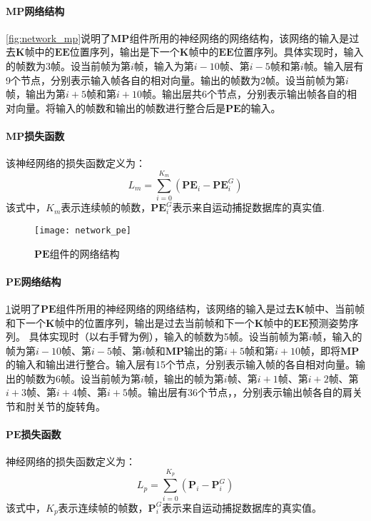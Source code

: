 \paragraph{$\mathbf{MP}$网络结构}\cref{fig:network_mp}说明了$\mathbf{MP}$组件所用的神经网络的网络结构，该网络的输入是过去$\mathbf{K}$帧中的$\mathbf{EE}$位置序列，输出是下一个$\mathbf{K}$帧中的$\mathbf{EE}$位置序列。具体实现时，输入的帧数为$3$帧。设当前帧为第$i$帧，输入为第$i-10$帧、第$i-5$帧和第$i$帧。输入层有9个节点，分别表示输入帧各自的相对向量。输出的帧数为$2$帧。设当前帧为第$i$帧，输出为第$i+5$帧和第$i+10$帧。输出层共6个节点，分别表示输出帧各自的相对向量。将输入的帧数和输出的帧数进行整合后是$\mathbf{PE}$的输入。
\paragraph{$\mathbf{MP}$损失函数}

该神经网络的损失函数定义为：
\begin{equation}
L_m = \sum_{i=0}^{K_m} (\mathbf{PE}_i - \mathbf{PE}_i^G)
\end{equation}
该式中，$K_m$表示连续帧的帧数，$\mathbf{PE}_i^G$表示来自运动捕捉数据库的真实值.

\begin{figure}[!h]
	\centering
	\texttt{[image: network\_pe]}
	\caption[]{\label{fig:network_pe}
	$\mathbf{PE}$组件的网络结构
	}
\end{figure}

\paragraph{$\mathbf{PE}$网络结构}
\cref{fig:network_pe}说明了$\mathbf{PE}$组件所用的神经网络的网络结构，该网络的输入是过去$\mathbf{K}$帧中、当前帧和下一个$\mathbf{K}$帧中的位置序列，输出是过去当前帧和下一个$\mathbf{K}$帧中的$\mathbf{EE}$预测姿势序列。 具体实现时（以右手臂为例），输入的帧数为5帧。设当前帧为第$i$帧，输入的帧为第$i-10$帧、第$i-5$帧、第$i$帧和$\mathbf{MP}$输出的第$i+5$帧和第$i+10$帧，即将$\mathbf{MP}$
的输入和输出进行整合。输入层有15个节点，分别表示输入帧的各自相对向量。输出的帧数为$6$帧。设当前帧为第$i$帧，输出的帧为第$i$帧、第$i+1$帧、第$i+2$帧、第$i+3$帧、第$i+4$帧、第$i+5$帧。输出层有36个节点，，分别表示输出帧各自的肩关节和肘关节的旋转角。
\paragraph{$\mathbf{PE}$损失函数}
神经网络的损失函数定义为：
\begin{equation}
L_p = \sum_{i=0}^{K_p} (\mathbf{P}_i - \mathbf{P}_i^G)
\end{equation}
该式中，$K_p$表示连续帧的帧数，$\mathbf{P}_i^G$表示来自运动捕捉数据库的真实值。

